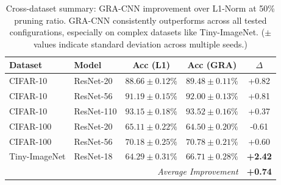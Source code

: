 \begin{table}[ht]
\centering
\caption{Cross-dataset summary: GRA-CNN improvement over L1-Norm at 50\% pruning ratio. GRA-CNN consistently outperforms across all tested configurations, especially on complex datasets like Tiny-ImageNet. ($\pm$ values indicate standard deviation across multiple seeds.)}
\label{tab:summary}
\begin{tabular}{llccc}
\toprule
Dataset & Model & Acc (L1) & Acc (GRA) & $\Delta$ \\
\midrule
CIFAR-10 & ResNet-20 & $88.66 \pm 0.12\%$ & $89.48 \pm 0.11\%$ & +0.82 \\
CIFAR-10 & ResNet-56 & $91.19 \pm 0.15\%$ & $92.00 \pm 0.13\%$ & +0.81 \\
CIFAR-10 & ResNet-110 & $93.15 \pm 0.18\%$ & $93.52 \pm 0.16\%$ & +0.37 \\
CIFAR-100 & ResNet-20 & $65.11 \pm 0.22\%$ & $64.50 \pm 0.20\%$ & -0.61 \\
CIFAR-100 & ResNet-56 & $70.18 \pm 0.25\%$ & $70.78 \pm 0.21\%$ & +0.60 \\
Tiny-ImageNet & ResNet-18 & $64.29 \pm 0.31\%$ & $\mathbf{66.71 \pm 0.28\%}$ & \textbf{+2.42} \\
\midrule
\multicolumn{4}{r}{\textit{Average Improvement}} & \textbf{+0.74} \\
\bottomrule
\end{tabular}
\end{table}
